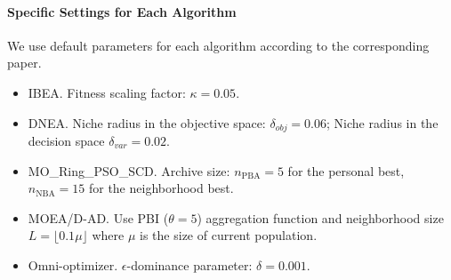 \documentclass[conference]{IEEEtran}
\begin{document}
\paragraph{Specific Settings for Each Algorithm}
We use default parameters for each algorithm according to the corresponding paper.
\begin{itemize}
    \item IBEA. Fitness scaling factor: $\kappa=0.05$.
    \item DNEA. Niche radius in the objective space: $\delta_{obj}=0.06$; Niche radius in the decision space $\delta_{var}=0.02$.
    \item MO\_Ring\_PSO\_SCD. Archive size: $n_{\text{PBA}}=5$ for the personal best, $n_{\text{NBA}}=15$ for the neighborhood best.
    \item MOEA/D-AD. Use PBI ($\theta=5$) aggregation function and neighborhood size $L = \lfloor 0.1\mu \rfloor$ where $\mu$ is the size of current population.
    \item Omni-optimizer. $\epsilon$-dominance parameter: $\delta=0.001$.
\end{itemize}
\end{document}
